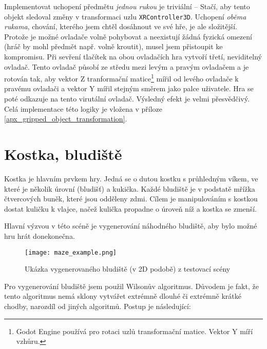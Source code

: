 Implementovat uchopení předmětu \textit{jednou rukou} je triviální -- Stačí, aby tento objekt sledoval změny v transformaci uzlu \texttt{XRController3D}. Uchopení \textit{oběma rukama}, chování, kterého jsem chtěl dosáhnout ve své hře, je ale složitější. Protože je možné ovladače volně pohybovat a neexistují žádná fyzická omezení (hráč by mohl předmět např. volně kroutit), musel jsem přistoupit ke kompromisu. Při sevření tlačítek na obou ovladačích hra vytvoří třetí, neviditelný ovladač. Tento ovladač působí ze středu mezi levým a pravým ovladačem a je rotován tak, aby vektor Z tranformační matice\footnote{Godot Engine používá pro rotaci uzlů transformační matice. Vektor Y míří vzhůru.} mířil od levého ovladače k pravému ovladači a vektor Y mířil stejným směrem jako palce uživatele. Hra se poté odkazuje na tento virutální ovladač. Výsledný efekt je velmi přesvědčivý. Celá implementace této logiky je vložena v příloze \ref{apx_gripped_object_transformation}.

\section{Kostka, bludiště}

Kostka je hlavním prvkem hry. Jedná se o dutou kostku s průhledným víkem, ve které je několik úrovní (bludišť) a kukička. Každé bludiště je v podstatě mřížka čtvercových buněk, které jsou odděleny zdmi. Cílem je manipulováním s kostkou dostat kuličku k vlajce, načež kulička propadne o úroveň níž a kostka se zmenší.

Hlavní výzvou v této scéně je vygenerování náhodného bludiště, aby bylo možné hru hrát donekonečna.

\begin{figure}[H]
  \centering
  \texttt{[image: maze\_example.png]}
  \caption{Ukázka vygenerovaného bludiště (v 2D podobě) z testovací scény}
  \label{maze_example}
\end{figure}

Pro vygenerování bludiště jsem použil Wilsonův algoritmus. Důvodem je fakt, že tento algoritmus nemá sklony vytvářet extrémně dlouhé či extrémně krátké chodby, narozdíl od jiných algoritmů. Postup je následující: \cite{enwiki:1193338583}

